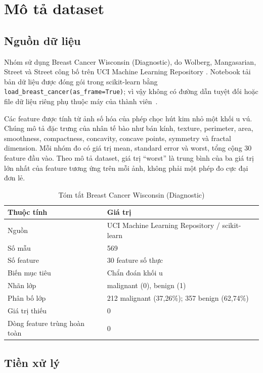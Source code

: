 \chapter{Mô tả dataset}
\label{chap:dataset}

\section{Nguồn dữ liệu}

Nhóm sử dụng Breast Cancer Wisconsin (Diagnostic), do Wolberg, Mangasarian,
Street và Street công bố trên UCI Machine Learning Repository
\cite{uci-breast-cancer}. Notebook tải bản dữ liệu được đóng gói trong
scikit-learn bằng \texttt{load\_breast\_cancer(as\_frame=True)}; vì vậy không
có đường dẫn tuyệt đối hoặc file dữ liệu riêng phụ thuộc máy của thành
viên~\cite{sklearn-dataset}.

Các feature được tính từ ảnh số hóa của phép chọc hút kim nhỏ một khối u vú.
Chúng mô tả đặc trưng của nhân tế bào như bán kính, texture, perimeter, area,
smoothness, compactness, concavity, concave points, symmetry và fractal
dimension. Mỗi nhóm đo có giá trị mean, standard error và worst, tổng cộng 30
feature đầu vào. Theo mô tả dataset, giá trị ``worst'' là trung bình của ba giá
trị lớn nhất của feature tương ứng trên mỗi ảnh, không phải một phép đo cực đại
đơn lẻ.

\begin{table}[H]
\centering
\caption{Tóm tắt Breast Cancer Wisconsin (Diagnostic)}
\label{tab:dataset-summary}
\begin{tabular}{p{5.0cm}p{8.5cm}}
\toprule
Thuộc tính & Giá trị \\
\midrule
Nguồn & UCI Machine Learning Repository / scikit-learn \\
Số mẫu & 569 \\
Số feature & 30 feature số thực \\
Biến mục tiêu & Chẩn đoán khối u \\
Nhãn lớp & malignant (0), benign (1) \\
Phân bố lớp & 212 malignant (37,26\%); 357 benign (62,74\%) \\
Giá trị thiếu & 0 \\
Dòng feature trùng hoàn toàn & 0 \\
\bottomrule
\end{tabular}
\end{table}

\section{Tiền xử lý}

